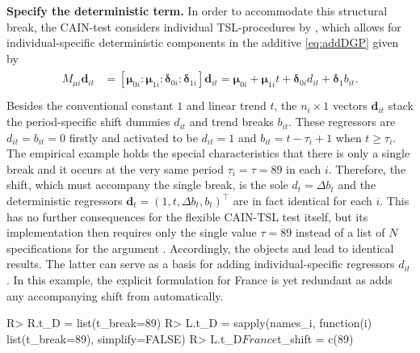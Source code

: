 \textbf{Specify the deterministic term.} In order to accommodate this structural break, the CAIN-test considers individual TSL-procedures by \citet{TrenklerEtAl2008}, which allows for individual-specific deterministic components in the additive \eqref{eq:addDGP} given by
\begin{align} \label{eq:detTerm}
\begin{split}
	M_{\mu i} \boldsymbol{d}_{it} & = \left[ \boldsymbol{\mu}_{0i} : \boldsymbol{\mu}_{1i} : \boldsymbol{\delta}_{0i} : \boldsymbol{\delta}_{1i} \right] \boldsymbol{d}_{it}	= \boldsymbol{\mu}_{0i} + \boldsymbol{\mu}_{1i}t + \boldsymbol{\delta}_{0i} d_{it} + \boldsymbol{\delta}_1 b_{it}. \\
\end{split}
\end{align}
Besides the conventional constant $ 1 $ and linear trend $ t $, the $ n_i \times 1 $ vectors $ \boldsymbol{d}_{it} $ stack the period-specific shift dummies $ d_{it} $ and trend breaks $ b_{it} $. These regressors are $ d_{it} = b_{it} = 0 $ firstly and activated to be  $ d_{it} = 1 $ and  $ b_{it} = t -\tau_i +1 $ when $ t \geq \tau_i $. The empirical example holds the special characteristics that there is only a single break and it occurs at the very same period $ \tau_i = \tau = 89 $ in each $ i $. Therefore, the shift, which must accompany the single break, is the sole $ d_{t} = \Delta b_t $ and the deterministic regressors $ \boldsymbol{d}_{t} = \left( 1, t, \Delta b_t, b_t \right)^\top $ are in fact identical for each $ i $. This has no further consequences for the flexible CAIN-TSL test itself, but its implementation  then requires only the single value $ \tau=89 $ instead of a list of $ N $ specifications for the argument . Accordingly, the objects  and  lead to identical results. The latter can serve as a basis for adding individual-specific regressors $ d_{it} $. In this example, the explicit formulation for France is yet redundant as  adds any accompanying shift from  automatically.
\begin{CodeChunk}
\begin{CodeInput}
R> R.t_D = list(t_break=89)
R> L.t_D = sapply(names_i, function(i) list(t_break=89), simplify=FALSE)
R> L.t_D$France$t_shift = c(89)
\end{CodeInput}
\end{CodeChunk}

